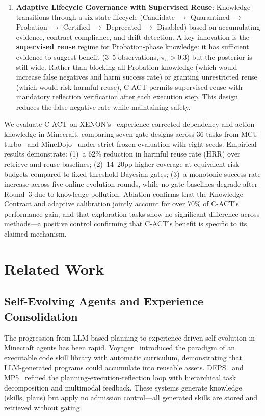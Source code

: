 \documentclass[letterpaper]{article}
\begin{document}
\begin{enumerate}
    \item \textbf{Adaptive Lifecycle Governance with Supervised Reuse}: Knowledge transitions through a six-state lifecycle (Candidate $\rightarrow$ Quarantined $\rightarrow$ Probation $\rightarrow$ Certified $\rightarrow$ Deprecated $\rightarrow$ Disabled) based on accumulating evidence, contract compliance, and drift detection. A key innovation is the \textbf{supervised reuse} regime for Probation-phase knowledge: it has sufficient evidence to suggest benefit (3--5 observations, $\pi_u > 0.3$) but the posterior is still wide. Rather than blocking all Probation knowledge (which would increase false negatives and harm success rate) or granting unrestricted reuse (which would risk harmful reuse), \textsc{C-ACT} permits supervised reuse with mandatory reflection verification after each execution step. This design reduces the false-negative rate while maintaining safety.
\end{enumerate}

We evaluate \textsc{C-ACT} on \textsc{XENON}'s~\cite{xenon2024} experience-corrected dependency and action knowledge in Minecraft, comparing seven gate designs across 36 tasks from MCU-turbo~\cite{mcu2024} and MineDojo~\cite{minedojo2022} under strict frozen evaluation with eight seeds. Empirical results demonstrate: (1)~a 62\% reduction in harmful reuse rate (HRR) over retrieve-and-reuse baselines; (2)~14--20pp higher coverage at equivalent risk budgets compared to fixed-threshold Bayesian gates; (3)~a monotonic success rate increase across five online evolution rounds, while no-gate baselines degrade after Round~3 due to knowledge pollution. Ablation confirms that the Knowledge Contract and adaptive calibration jointly account for over 70\% of \textsc{C-ACT}'s performance gain, and that exploration tasks show no significant difference across methods---a positive control confirming that \textsc{C-ACT}'s benefit is specific to its claimed mechanism.

\section{Related Work}

\subsection{Self-Evolving Agents and Experience Consolidation}

The progression from LLM-based planning to experience-driven self-evolution in Minecraft agents has been rapid. Voyager~\cite{voyager2023} introduced the paradigm of an executable code skill library with automatic curriculum, demonstrating that LLM-generated programs could accumulate into reusable assets. DEPS~\cite{deps2023} and MP5~\cite{mp52024} refined the planning-execution-reflection loop with hierarchical task decomposition and multimodal feedback. These systems generate knowledge (skills, plans) but apply no admission control---all generated skills are stored and retrieved without gating.
\end{document}
